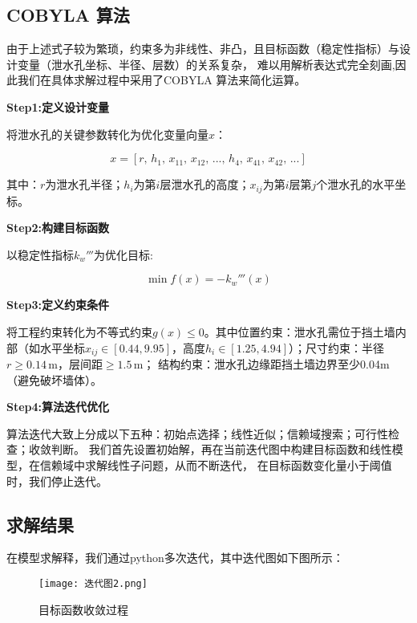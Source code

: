 \documentclass[withoutpreface,bwprint]{cumcmthesis}
\begin{document}
\subsection{COBYLA 算法}
由于上述式子较为繁琐，约束多为非线性、非凸，且目标函数（稳定性指标）与设计变量（泄水孔坐标、半径、层数）的关系复杂，
难以用解析表达式完全刻画,因此我们在具体求解过程中采用了COBYLA 算法来简化运算。
\par
\textbf{Step1:定义设计变量}\par
将泄水孔的关键参数转化为优化变量向量\(x\)：
\par
    \begin{equation}
        x = [r, \, h_1, \, x_{11}, \, x_{12}, \, ..., \, h_4, \, x_{41}, \, x_{42}, \, ...] 
    \end{equation}
\par
其中：\(r\)为泄水孔半径；\(h_i\)为第\(i\)层泄水孔的高度；\(x_{ij}\)为第\(i\)层第\(j\)个泄水孔的水平坐标。    

\par
\textbf{Step2:构建目标函数}\par
以稳定性指标\(k_w'''\)为优化目标:
\par
    \begin{equation}
        \min f(x) = -k_w'''(x)
    \end{equation}

\par

\textbf{Step3:定义约束条件}\par
将工程约束转化为不等式约束\(g(x) \leq 0\)。其中位置约束：泄水孔需位于挡土墙内部（如水平坐标\(x_{ij} \in [0.44, 9.95]\)，高度\(h_i \in [1.25, 4.94]\)）；尺寸约束：半径\(r \geq 0.14\,\text{m}\)，层间距\(\geq 1.5\,\text{m}\)；
结构约束：泄水孔边缘距挡土墙边界至少0.04m（避免破坏墙体）。
\par
\textbf{Step4:算法迭代优化}\par
算法迭代大致上分成以下五种：初始点选择；线性近似；信赖域搜索；可行性检查；收敛判断。
我们首先设置初始解，再在当前迭代图中构建目标函数和线性模型，在信赖域中求解线性子问题，从而不断迭代，
在目标函数变化量小于阈值时，我们停止迭代。



\subsection{求解结果}
在模型求解释，我们通过python多次迭代，其中迭代图如下图所示：

    \begin{figure}[H]
        \centering
        \texttt{[image: 迭代图2.png]}
        \caption{目标函数收敛过程}
        \label{fig:单图}
    \end{figure}
\end{document}
